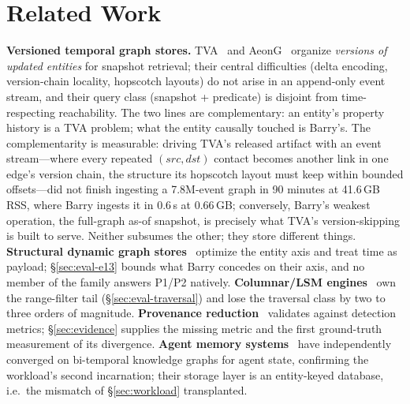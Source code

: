 \documentclass[11pt,letterpaper,twocolumn]{article}
\begin{document}
\section{Related Work}
\label{sec:related}
\textbf{Versioned temporal graph stores.} TVA~\cite{li2026tva} and
AeonG~\cite{hou2024aeong} organize \emph{versions of updated entities}
for snapshot retrieval; their central difficulties (delta encoding,
version-chain locality, hopscotch layouts) do not arise in an
append-only event stream, and their query class (snapshot + predicate)
is disjoint from time-respecting reachability. The two lines are
complementary: an entity's property history is a TVA problem; what the
entity causally touched is Barry's. The complementarity is measurable:
driving TVA's released artifact with an event stream---where every
repeated $(src,dst)$ contact becomes another link in one edge's
version chain, the structure its hopscotch layout must keep within
bounded offsets---did not finish ingesting a 7.8M-event graph in 90
minutes at 41.6\,GB RSS, where Barry ingests it in 0.6\,s at
0.66\,GB; conversely, Barry's weakest operation, the full-graph
as-of snapshot, is precisely what TVA's version-skipping is built to
serve. Neither subsumes the other; they store different things.
\textbf{Structural dynamic graph stores}~\cite{wheatman2021ppcsr,
shen2026dcsr, dhulipala2019aspen, fuchs2023sortledton} optimize the
entity axis and treat time as payload; \S\ref{sec:eval-e13} bounds
what Barry concedes on their axis, and no member of the family
answers P1/P2 natively.
\textbf{Columnar/LSM engines}~\cite{raasveldt2019duckdb} own the
range-filter tail (\S\ref{sec:eval-traversal}) and lose the traversal
class by two to three orders of magnitude.
\textbf{Provenance reduction}~\cite{zhang2025tapas, hassan2019nodoze}
validates against detection metrics; \S\ref{sec:evidence} supplies
the missing metric and the first ground-truth measurement of its
divergence.
\textbf{Agent memory systems}~\cite{rasmussen2025zep} have
independently converged on bi-temporal knowledge graphs for agent
state, confirming the workload's second incarnation; their storage
layer is an entity-keyed database, i.e.\ the mismatch of
\S\ref{sec:workload} transplanted.

\end{document}
